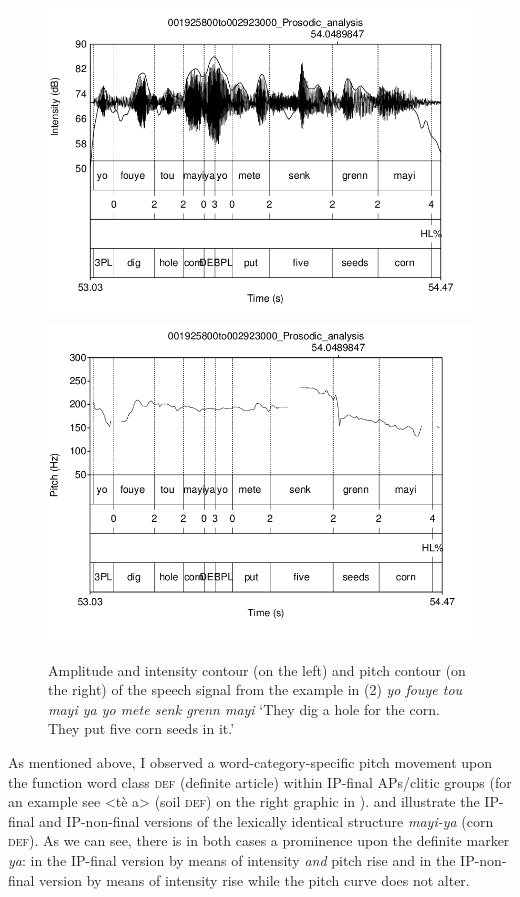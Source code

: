 \documentclass[output=paper]{langsci/langscibook}
\begin{document}
\begin{figure}  
\includegraphics[width=\textwidth]{figures/KALPeerreviewedkorr-img6.png}
\includegraphics[width=\textwidth]{figures/KALPeerreviewedkorr-img7.png}

\caption{\label{fig:kal:5} Amplitude and intensity contour (on the left) and pitch contour (on the right) of the speech signal from the example in (2) \textit{yo fouye tou mayi ya yo mete senk grenn mayi} ‘They dig a hole for the corn. They put five corn seeds in it.’}
\end{figure}


As mentioned above, I observed a word-category-specific pitch movement upon the function word class \textsc{def} (definite article) within IP-final APs/clitic groups (for an example see <tè a> (soil \textsc{def}) on the right graphic in ).  and  illustrate the IP-final and IP-non-final versions of the lexically identical structure \textit{mayi-ya} (corn \textsc{def}). As we can see, there is in both cases a prominence upon the definite marker \textit{ya}: in the IP-final version by means of intensity \textit{and} pitch rise and in the IP-non-final version by means of intensity rise while the pitch curve does not alter.
\end{document}
